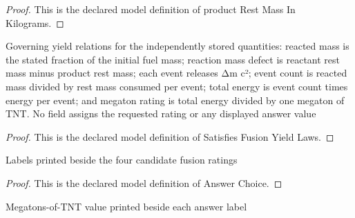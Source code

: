 \begin{proof}
  This is the declared model definition of product Rest Mass In Kilograms.
\end{proof}
\begin{definition}
  \label{def:physics:phyx-mini-0573:phyxminiproblems-problemphyxmini0573-satisfiesfusionyieldlaws}
  Governing yield relations for the independently stored quantities: reacted mass is the stated fraction of the initial fuel mass; reaction mass defect is reactant rest mass minus product rest mass; each event releases Δm c²; event count is reacted mass divided by rest mass consumed per event; total energy is event count times energy per event; and megaton rating is total energy divided by one megaton of TNT. No field assigns the requested rating or any displayed answer value
\end{definition}
\begin{proof}
  This is the declared model definition of Satisfies Fusion Yield Laws.
\end{proof}
\begin{definition}
  \label{def:physics:phyx-mini-0573:phyxminiproblems-problemphyxmini0573-answerchoice}
  Labels printed beside the four candidate fusion ratings
\end{definition}
\begin{proof}
  This is the declared model definition of Answer Choice.
\end{proof}
\begin{definition}
  \label{def:physics:phyx-mini-0573:phyxminiproblems-problemphyxmini0573-answerchoice-ratingmegatonstnt}
  Megatons-of-TNT value printed beside each answer label
\end{definition}
